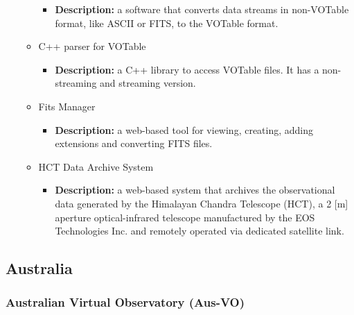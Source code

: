 \begin{itemize}
\begin{itemize}
\begin{itemize}
\item \textbf{Description:} a software that converts data streams in non-VOTable
format, like ASCII or FITS, to the VOTable format.
\end{itemize}
\item C++ parser for VOTable
\begin{itemize}
\item \textbf{Description:} a C++ library to access VOTable files. It has a
non-streaming and streaming version.
\end{itemize}
\item Fits Manager
\begin{itemize}
\item \textbf{Description:} a web-based tool for viewing, creating, adding
extensions and converting FITS files.
\end{itemize}
\item HCT Data Archive System
\begin{itemize}
\item \textbf{Description:} a web-based system that archives the observational
data generated by the Himalayan Chandra Telescope (HCT), a 2 [m] aperture
optical-infrared telescope manufactured by the EOS Technologies Inc. and
remotely operated via dedicated satellite link.
\end{itemize}
\end{itemize}
\end{itemize}

\subsection{Australia}
\subsubsection{Australian Virtual Observatory (Aus-VO)}

